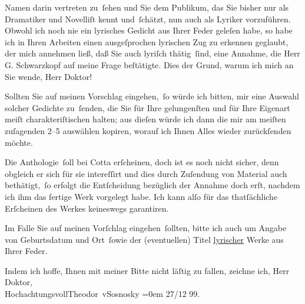       Namen darin vertreten zu ſehen und
      Sie dem Publikum, das Sie bisher nur
      als Dramatiker und Novelliſt kennt
      und ſchätzt, nun auch als Lyriker
                {\pb}vorzuführen. Obwohl ich noch nie ein
      lyrisches Gedicht aus Ihrer Feder geleſen
      habe, so habe ich in Ihren Arbeiten einen
      ausgeſprochen lyrischen Zug zu erkennen
      geglaubt, der mich annehmen ließ, daß
      Sie auch lyriſch thätig ſind, eine Annahme, die Herr G. Schwarzkopf auf meine
      Frage beſtätigte. Dies der Grund, warum
      ich mich an Sie wende, Herr Doktor!\pend
           
\pstart
           Sollten Sie auf meinen Vorschlag
      eingehen, ſo würde ich bitten, mir eine
      Auswahl solcher Gedichte zu ſenden, die
      Sie für Ihre gelungenſten und für
      Ihre Eigenart meiſt charakteriſtischen
      halten; aus dieſen würde ich dann
      die mir am meiſten zuſagenden 2–5
      auswählen {\kaufmannsund} kopiren, worauf ich Ihnen
         Alles wieder zurückſenden möchte.\pend
           
\pstart
           Die Anthologie ſoll bei Cotta erſcheinen, doch ist es noch nicht sicher, denn
      obgleich er sich für sie intereſſirt
      und dies durch Zuſendung von Material
                {\pb}auch bethätigt, ſo erfolgt die Entſcheidung
      bezüglich der Annahme doch erſt, nachdem
      ich ihm das fertige Werk vorgelegt habe.
            Ich kann alſo für das thatſächliche Erſcheinen des Werkes keineswegs garantiren.\pend
           
\pstart
           Im Falle Sie auf meinen Vorſchlag eingehen ſollten, bitte ich auch um Angabe
      von Geburtsdatum und Ort ſowie der
      (eventuellen) Titel \uline{lyrischer} Werke aus
      Ihrer Feder.\pend
           
\pstart
           Indem ich hoffe, Ihnen mit meiner Bitte nicht läſtig zu fallen, zeichne ich, Herr Doktor, {\\[\baselineskip]}Hochachtungsvoll\spacefill\mbox{Theodor vSosnosky}\pend
           \leftskip=0em{}
\pstart
           \noindent{}27/12 99.\pend
           
